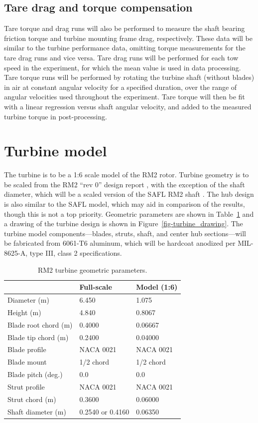 \documentclass[12pt,letterpaper]{scrreprt}
\begin{document}
\subsection{Tare drag and torque compensation} 

Tare torque and drag runs will also be performed to measure the shaft bearing
friction torque and turbine mounting frame drag, respectively. These data will
be similar to the turbine performance data, omitting torque measurements for the
tare drag runs and vice versa. Tare drag runs will be performed for each tow
speed in the experiment, for which the mean value is used in data processing.
Tare torque runs will be performed by rotating the turbine shaft (without
blades) in air at constant angular velocity for a specified duration, over the
range of angular velocities used throughout the experiment. Tare torque will
then be fit with a linear regression versus shaft angular velocity, and added to
the measured turbine torque in post-processing.

\section{Turbine model}

The turbine is to be a 1:6 scale model of the RM2 rotor. Turbine geometry is to
be scaled from the RM2 ``rev 0'' design report \cite{Barone2011}, with the
exception of the shaft diameter, which will be a scaled version of the SAFL RM2
shaft \cite{Hill2014}. The hub design is also similar to the SAFL model, which
may aid in comparison of the results, though this is not a top priority.
Geometric parameters are shown in Table~\ref{tab-turb_geom} and a drawing of the
turbine design is shown in Figure~\ref{fig-turbine_drawing}. The turbine model
components---blades, struts, shaft, and center hub sections---will be fabricated
from 6061-T6 aluminum, which will be hardcoat anodized per MIL-8625-A, type III,
class 2 specifications.

\begin{table}[ht]
\centering
\begin{tabular}{l|l|l}
   & Full-scale & Model (1:6) \\
\hline 
Diameter (m)   & 6.450 & 1.075 \\ 
Height (m)     & 4.840 & 0.8067 \\ 
Blade root chord (m) & 0.4000 & 0.06667 \\ 
Blade tip chord (m)  & 0.2400 & 0.04000 \\ 
Blade profile & NACA 0021 & NACA 0021 \\ 
Blade mount & 1/2 chord & 1/2 chord \\ 
Blade pitch (deg.) & 0.0 & 0.0 \\ 
Strut profile & NACA 0021 & NACA 0021 \\ 
Strut chord (m) & 0.3600 & 0.06000 \\ 
Shaft diameter (m) & 0.2540 \cite{Beam2011} or 0.4160 \cite{Hill2014} & 0.06350\\ 
\end{tabular}
\caption{RM2 turbine geometric parameters.}
\label{tab-turb_geom}
\end{table}
\end{document}
